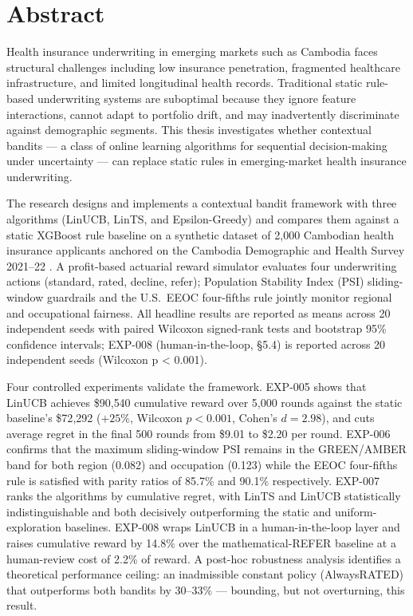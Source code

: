 \chapter*{\centering Abstract}

\hs Health insurance underwriting in emerging markets such as Cambodia faces structural challenges including low insurance penetration, fragmented healthcare infrastructure, and limited longitudinal health records. Traditional static rule-based underwriting systems are suboptimal because they ignore feature interactions, cannot adapt to portfolio drift, and may inadvertently discriminate against demographic segments. This thesis investigates whether contextual bandits --- a class of online learning algorithms for sequential decision-making under uncertainty --- can replace static rules in emerging-market health insurance underwriting.

The research designs and implements a contextual bandit framework with three algorithms (LinUCB, LinTS, and Epsilon-Greedy) and compares them against a static XGBoost rule baseline on a synthetic dataset of 2{,}000 Cambodian health insurance applicants anchored on the Cambodia Demographic and Health Survey 2021--22 \citep{NIS2023}. A profit-based actuarial reward simulator evaluates four underwriting actions (standard, rated, decline, refer); Population Stability Index (PSI) sliding-window guardrails and the U.S.\ EEOC four-fifths rule jointly monitor regional and occupational fairness. All headline results are reported as means across 20 independent seeds with paired Wilcoxon signed-rank tests and bootstrap 95\% confidence intervals; EXP-008 (human-in-the-loop, §5.4) is reported across 20 independent seeds (Wilcoxon p \textless{} 0.001).

Four controlled experiments validate the framework. EXP-005 shows that LinUCB achieves \$90{,}540 cumulative reward over 5{,}000 rounds against the static baseline's \$72{,}292 ($+25\%$, Wilcoxon $p < 0.001$, Cohen's $d = 2.98$), and cuts average regret in the final 500 rounds from \$9.01 to \$2.20 per round. EXP-006 confirms that the maximum sliding-window PSI remains in the GREEN/AMBER band for both region (0.082) and occupation (0.123) while the EEOC four-fifths rule is satisfied with parity ratios of 85.7\% and 90.1\% respectively. EXP-007 ranks the algorithms by cumulative regret, with LinTS and LinUCB statistically indistinguishable and both decisively outperforming the static and uniform-exploration baselines. EXP-008 wraps LinUCB in a human-in-the-loop layer and raises cumulative reward by 14.8\% over the mathematical-REFER baseline at a human-review cost of 2.2\% of reward. A post-hoc robustness analysis identifies a theoretical performance ceiling: an inadmissible constant policy (AlwaysRATED) that outperforms both bandits by 30--33\% --- bounding, but not overturning, this result.

